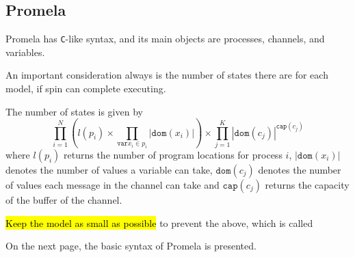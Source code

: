 \subsection{Promela}
Promela has \texttt{C}-like syntax, and its main objects are processes, channels, and variables.

An important consideration always is the number of states there are for each model, if spin can complete executing.

The number of states is given by
\[
    \prod_{i = 1}^N (l(p_i) \times \prod_{\texttt{var} x_i \in p_i} |\texttt{dom}(x_i)|) \times \prod_{j = 1}^{K} |\texttt{dom}(c_j)|^{\texttt{cap}(c_j)}
\]
where $l(p_i)$ returns the number of program locations for process $i$, $|\texttt{dom}(x_i)|$ denotes the number of values a variable can take,
$\texttt{dom}(c_j)$ denotes the number of values each message in the channel can take and $\texttt{cap}(c_j)$ returns the capacity of the buffer of the channel.


 \hl{Keep the model as small as possible} to prevent the above, which is called 

On the next page, the basic syntax of Promela is presented.

\newpage

